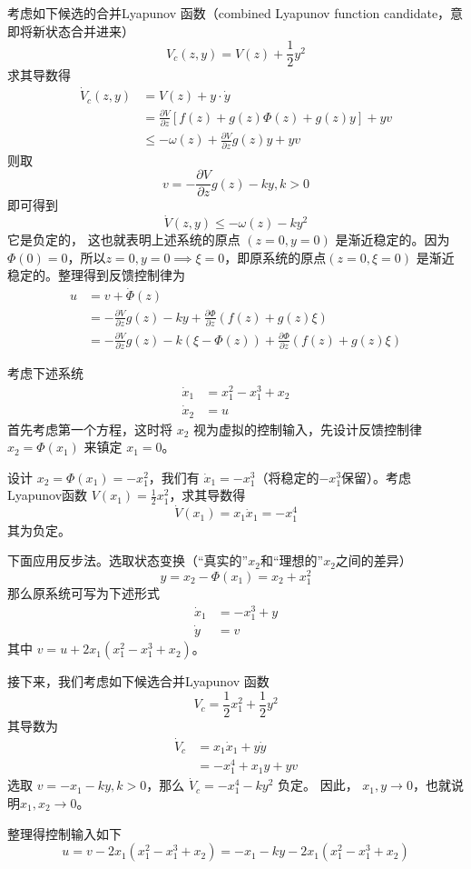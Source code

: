 考虑如下候选的合并Lyapunov 函数（combined Lyapunov function candidate，意即将新状态合并进来）
\[ V_c (z, y) = V (z) + \frac{1}{2} y^2 \]
求其导数得
\begin{align*}
  \dot{V}_c (z, y) & = V (z) + y \cdot \dot{y}\\
  & = \frac{\partial V}{\partial z} [f (z) + g (z) \Phi (z) + g (z) y] + y 
  v\\
  & \leq - \omega (z) + \frac{\partial V}{\partial z} g (z) y + y  v
\end{align*}
则取 \[v = - \frac{\partial V}{\partial z} g (z) - k  y, k > 0\]
即可得到\[\dot{V} (z, y) \leq - \omega (z) - k  y^2\]
它是负定的，
这也就表明上述系统的原点 $(z = 0, y = 0)$ 是渐近稳定的。因为
$\Phi (0) = 0$，所以$z = 0, y = 0\implies \xi =0$，即原系统的原点$(z = 0, \xi = 0)$ 是渐近稳定的。整理得到反馈控制律为
\begin{align*}
  u & = v + \dot{\Phi}(z)\\
  & = - \frac{\partial V}{\partial z} g (z) - k  y + \frac{\partial
  \Phi}{\partial z} (f (z) + g (z) \xi)\\
  & = - \frac{\partial V}{\partial z} g (z) - k  (\xi - \Phi (z)) +
  \frac{\partial \Phi}{\partial z} (f (z) + g (z) \xi)
\end{align*}
\begin{example}[利用反步法进行非线性系统设计]
  考虑下述系统
  \begin{align*}
    \dot{x}_1 & = x^2_1 - x^3_1 + x_2\\
    \dot{x}_2 & = u
  \end{align*}
 首先考虑第一个方程，这时将 $x_2$ 视为虚拟的控制输入，先设计反馈控制律 $x_2
  = \Phi (x_1)$ 来镇定 $x_1 = 0$。
  
  设计 $x_2 = \Phi (x_1) = - x^2_1$，我们有 $\dot{x}_1 = - x^3_1$（将稳定的$- x^3_1$保留）。考虑Lyapunov函数
  $V (x_1) = \frac{1}{2} x^2_1$，求其导数得
  \[ \dot{V} (x_1) = x_1 \dot{x}_1 = - x^4_1 \]
  其为负定。
  
  下面应用反步法。选取状态变换（“真实的”$x_2$和“理想的”$x_2$之间的差异）
  \[ y = x_2 - \Phi (x_1) = x_2 + x^2_1 \]
  那么原系统可写为下述形式
  \begin{align*}
    \dot{x}_1 & = - x^3_1 + y\\
    \dot{y}  & = v
  \end{align*}
  其中 $v = u + 2 x_1 (x^2_1 - x^3_1 + x_2)$。
  
  接下来，我们考虑如下候选合并Lyapunov 函数
  \[ V_c = \frac{1}{2} x^2_1 + \frac{1}{2} y^2 \]
  其导数为
  \begin{align*}
    \dot{V}_c & = x_1 \dot{x}_1 + y  \dot{y}\\
    & = - x^4_1 + x_1 y + y  v
  \end{align*}
  选取 $v = - x_1 - k  y, k > 0$，那么 $\dot{V}_c = - x^4_1 - k  y^2$ 负定。
  因此， $x_1, y \rightarrow 0$，也就说明$x_1,x_2\rightarrow 0$。
  
  整理得控制输入如下
  \[ u = v - 2 x_1 (x^2_1 - x^3_1 + x_2) = - x_1 - k  y - 2 x_1 (x^2_1 - x^3_1
     + x_2) \]
\end{example}

